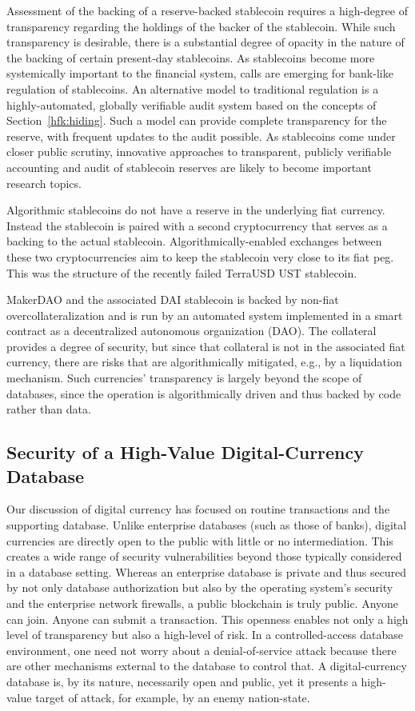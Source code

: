 \documentclass[11pt,dvipdfm]{article}
\begin{document}
Assessment of the backing of a reserve-backed stablecoin requires a high-degree of transparency regarding
the holdings of the backer of the stablecoin. 
While such transparency is desirable, there is a substantial degree of opacity in the nature of the backing
of certain present-day stablecoins.
As stablecoins become more systemically important to the financial system,  calls are emerging for bank-like
regulation of stablecoins.  An alternative model to traditional regulation is a highly-automated, globally 
verifiable audit system based on the concepts of Section~\ref{hfk:hiding}.
Such a model can provide complete transparency for the reserve, with frequent updates to the audit possible.
As stablecoins come under closer public scrutiny, innovative approaches to transparent, publicly verifiable accounting and
audit of stablecoin reserves are likely to become important research topics.

Algorithmic stablecoins do not have a reserve in the underlying fiat currency.  Instead the stablecoin is paired with a second cryptocurrency that
serves as a backing to the actual stablecoin.  Algorithmically-enabled exchanges between these two cryptocurrencies
aim to keep the stablecoin very close to its fiat peg.
This was the structure of the recently failed TerraUSD UST stablecoin.

MakerDAO and the associated DAI stablecoin is backed by non-fiat overcollateralization and is run by an
automated system implemented in a smart contract as a decentralized autonomous organization (DAO).
The collateral provides a degree of security, but since that collateral is not in the associated fiat currency,
there are risks that are algorithmically mitigated, e.g., by a liquidation mechanism.  
Such currencies' transparency is largely beyond the scope of databases, since the operation is
algorithmically driven and thus backed by code rather than data.


\subsection{Security of a High-Value Digital-Currency Database}
Our discussion of digital currency has focused on routine transactions and the supporting database.
Unlike enterprise databases (such as those of banks), digital currencies are directly open to the public
with little or no intermediation.
This creates a wide range of security vulnerabilities beyond those typically considered in a database setting.
Whereas an enterprise database is private and thus secured by not only database authorization but also
by the operating system's security and the enterprise network firewalls, a public blockchain is truly public.
Anyone can join.  Anyone can submit a transaction.
This openness enables not only a high level of transparency but also a high-level of risk.
In a controlled-access database environment, one need not worry about a denial-of-service attack because
there are other mechanisms external to the database to control that.
A digital-currency database is, by its nature, necessarily open and public, yet it presents a high-value
target of attack, for example, by an enemy nation-state.
\end{document}
